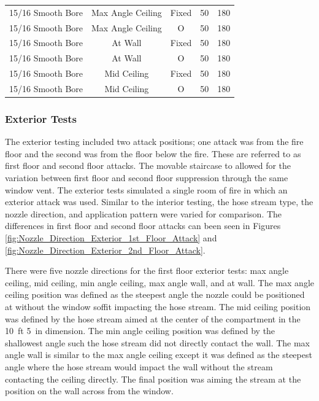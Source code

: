 \documentclass{article}
\begin{document}
\begin{table}[]
\begin{tabular}{ccccc}
15/16 Smooth Bore & Max Angle Ceiling   & Fixed   & 50 & 180 \\
15/16 Smooth Bore & Max Angle Ceiling   & O & 50  & 180 \\
15/16 Smooth Bore & At Wall     		& Fixed   & 50 & 180 \\
15/16 Smooth Bore & At Wall     		& O & 50  & 180 \\
15/16 Smooth Bore & Mid Ceiling 		& Fixed   & 50 & 180 \\
15/16 Smooth Bore & Mid Ceiling 		& O & 50  & 180 \\
\bottomrule[1.25pt]
\end{tabular}
\end{table}

\clearpage

\subsubsection{Exterior Tests}
\label{ext_tests}

The exterior testing included two attack positions; one attack was from the fire floor and the second was from the floor below the fire. These are referred to as first floor and second floor attacks. The movable staircase to allowed for the variation between first floor and second floor suppression through the same window vent. The exterior tests simulated a single room of fire in which an exterior attack was used. Similar to the interior testing, the hose stream type, the nozzle direction, and application pattern were varied for comparison. The differences in first floor and second floor attacks can been seen in Figures \ref{fig:Nozzle_Direction_Exterior_1st_Floor_Attack} and \ref{fig:Nozzle_Direction_Exterior_2nd_Floor_Attack}. 

There were five nozzle directions for the first floor exterior tests: max angle ceiling, mid ceiling, min angle ceiling, max angle wall, and at wall. The max angle ceiling position was defined as the steepest angle the nozzle could be positioned at without the window soffit impacting the hose stream. The mid ceiling position was defined by the hose stream aimed at the center of the compartment in the 10~ft 5~in dimension. The min angle ceiling position was defined by the shallowest angle such the hose stream did not directly contact the wall. The max angle wall is similar to the max angle ceiling except it was defined as the steepest angle where the hose stream would impact the wall without the stream contacting the ceiling directly. The final position was aiming the stream at the position on the wall across from the window.
\end{document}
